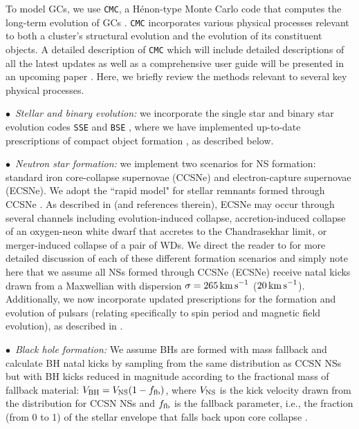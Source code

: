 \documentclass[twocolumn,tighten]{aastex63}
\begin{document}
To model GCs, we use \texttt{CMC}, a H\'{e}non-type Monte Carlo code that computes the long-term evolution of GCs \citep{Henon1971a,Henon1971b,Joshi2000,Joshi2001,Fregeau2003,Chatterjee2010,Chatterjee2013,Pattabiraman2013,Rodriguez2015a}. \texttt{CMC} incorporates various physical processes relevant to both a cluster's structural evolution and the evolution of its constituent objects. A detailed description of \texttt{CMC} which will include detailed descriptions of all the latest updates as well as a comprehensive user guide will be presented in an upcoming paper \citep{Rodriguez2019c}. Here, we briefly review the methods relevant to several key physical processes.

    
     $\bullet\,$ \textit{Stellar and binary evolution:} we incorporate the single star and binary star evolution codes \texttt{SSE} and \texttt{BSE} \citep{Hurley2000, Hurley2002}, where we have implemented up-to-date prescriptions of compact object formation \citep{Fryer2001,Vink2001,Belczynski2002,Hobbs2005,Morscher2015}, as described below.
    
     $\bullet\,$ \textit{Neutron star formation:} we implement two scenarios for NS formation: standard iron core-collapse supernovae (CCSNe) and electron-capture supernovae (ECSNe). We adopt the ``rapid model" for stellar remnants formed through CCSNe \citep{Fryer2012}. As described in \citet{Ye2018} (and references therein), ECSNe may occur through several channels including evolution-induced collapse, accretion-induced collapse of an oxygen-neon white dwarf that accretes to the Chandrasekhar limit, or merger-induced collapse of a pair of WDs. We direct the reader to \citet{Ye2018} for more detailed discussion of each of these different formation scenarios and simply note here that we assume all NSs formed through CCSNe (ECSNe) receive natal kicks drawn from a Maxwellian with dispersion $\sigma=265\,\rm{km\,s}^{-1}$ ($20\,\rm{km\,s}^{-1}$). Additionally, we now incorporate updated prescriptions for the formation and evolution of pulsars (relating specifically to spin period and magnetic field evolution), as described in \citet{Ye2018}.
    
    $\bullet\,$ \textit{Black hole formation:} We assume BHs are formed with mass fallback \citep[again, using the ``rapid model'' of][]{Fryer2012} and calculate BH natal kicks by sampling from the same distribution as CCSN NSs but with BH kicks reduced in magnitude according to the fractional mass of fallback material: $V_{\rm{BH}} = V_{\rm{NS}}(1-f_{\rm{fb}})$, where $V_{\rm{NS}}$ is the kick velocity drawn from the \citet{Hobbs2005} distribution for CCSN NSs and $f_{\rm{fb}}$ is the fallback parameter, i.e., the fraction (from 0 to 1) of the stellar envelope that falls back upon core collapse \citep[see][for further details]{Fryer2012,Belczynski2002,Morscher2015}.
    
\end{document}

